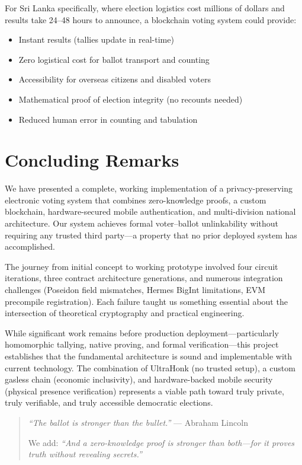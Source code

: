 For Sri Lanka specifically, where election logistics cost millions of dollars and results take 24--48 hours to announce, a blockchain voting system could provide:
\begin{itemize}
    \item Instant results (tallies update in real-time)
    \item Zero logistical cost for ballot transport and counting
    \item Accessibility for overseas citizens and disabled voters
    \item Mathematical proof of election integrity (no recounts needed)
    \item Reduced human error in counting and tabulation
\end{itemize}

\section{Concluding Remarks}

We have presented a complete, working implementation of a privacy-preserving electronic voting system that combines zero-knowledge proofs, a custom blockchain, hardware-secured mobile authentication, and multi-division national architecture. Our system achieves formal voter--ballot unlinkability without requiring any trusted third party---a property that no prior deployed system has accomplished.

The journey from initial concept to working prototype involved four circuit iterations, three contract architecture generations, and numerous integration challenges (Poseidon field mismatches, Hermes BigInt limitations, EVM precompile registration). Each failure taught us something essential about the intersection of theoretical cryptography and practical engineering.

While significant work remains before production deployment---particularly homomorphic tallying, native proving, and formal verification---this project establishes that the fundamental architecture is sound and implementable with current technology. The combination of UltraHonk (no trusted setup), a custom gasless chain (economic inclusivity), and hardware-backed mobile security (physical presence verification) represents a viable path toward truly private, truly verifiable, and truly accessible democratic elections.

\vspace{1cm}

\begin{quote}
\textit{``The ballot is stronger than the bullet.''} --- Abraham Lincoln

\vspace{0.3cm}

We add: \textit{``And a zero-knowledge proof is stronger than both---for it proves truth without revealing secrets.''}
\end{quote}
